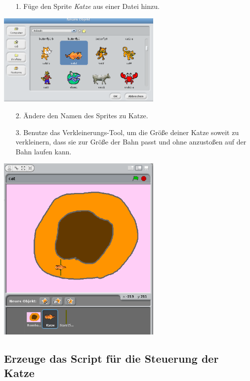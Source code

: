 \begin{itemize}
\item[1.] F{\"u}ge den Sprite \emph{Katze} aus einer Datei hinzu.
\end{itemize}
\includegraphics[width=0.6\textwidth]{images/aufgabe4_katze_sprite.png}
\begin{itemize}
\item[2. ] Ändere den Namen des Sprites zu Katze.
\end{itemize}
\begin{itemize}
\item[3.] Benutze das Verkleinerungs-Tool, um die Größe deiner Katze soweit zu verkleinern, dass sie zur Größe der Bahn passt und ohne anzusto{\ss}en auf der Bahn laufen kann.
\end{itemize}
\includegraphics[width=0.6\textwidth]{images/aufgabe4_katze_schrumpfen.png}

\subsection{Erzeuge das Script für die Steuerung der Katze}

